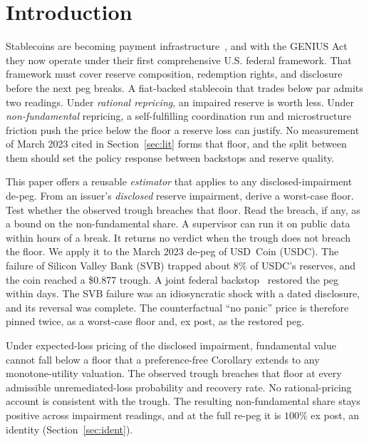 \section{Introduction}
\label{sec:intro}

Stablecoins are becoming payment infrastructure~\cite{geniusact2025}, and with the GENIUS
Act they now operate under their first comprehensive U.S. federal
framework. That framework must cover reserve composition, redemption rights, and
disclosure before the next peg breaks. A fiat-backed stablecoin that trades below par
admits two readings. Under \emph{rational repricing}, an impaired reserve is worth less.
Under \emph{non-fundamental} repricing, a self-fulfilling coordination run and
microstructure friction push the price below the floor a reserve loss can justify. No
measurement of March 2023 cited in Section~\ref{sec:lit} forms that floor, and the split
between them should set the policy response between backstops and reserve quality.

This paper offers a reusable \emph{estimator} that applies to any disclosed-impairment
de-peg. From an issuer's \emph{disclosed} reserve impairment,
derive a worst-case floor. Test whether the observed trough breaches that
floor. Read the breach, if any, as a bound on the non-fundamental share. A supervisor can run it on public data within hours of a break. It returns no verdict when the trough does not breach the floor. We apply it to
the March 2023 de-peg of USD~Coin (USDC). The failure of Silicon Valley Bank (SVB)
trapped about $8\%$ of USDC's reserves, and the coin reached a \$0.877 trough. A joint
federal backstop~\cite{fedtreasfdic2023pressrelease} restored the peg within days. The SVB
failure was an idiosyncratic shock with a dated disclosure, and its reversal was complete. The counterfactual ``no panic'' price is therefore pinned twice, as a
worst-case floor and, ex post, as the restored peg.

Under expected-loss pricing of the disclosed impairment, fundamental value cannot fall
below a floor that a preference-free Corollary extends to any monotone-utility valuation.
The observed trough breaches that floor at every admissible unremediated-loss probability
and recovery rate. No rational-pricing account is consistent with the trough. The resulting
non-fundamental share stays positive across impairment readings, and at the full re-peg
it is $100\%$ ex post, an identity (Section~\ref{sec:ident}).

